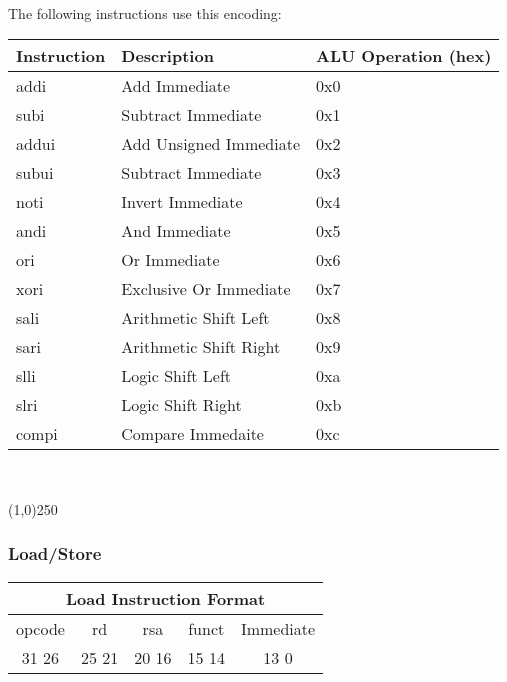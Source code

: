 \documentclass[letterpaper, 11pt]{article}
\begin{document}
\paragraph{}The following instructions use this encoding:
\begin{center}
	\begin{tabular}{|l|l|l|} \hline
			Instruction & Description 						& ALU Operation (hex) \\ \hline
			addi		& Add Immediate						& 0x0 \\ \hline
			subi 		& Subtract Immediate				& 0x1 \\ \hline
			addui 		& Add Unsigned Immediate			& 0x2 \\ \hline
			subui		& Subtract Immediate 				& 0x3 \\ \hline
			noti		& Invert Immediate					& 0x4 \\ \hline
			andi		& And Immediate						& 0x5 \\ \hline
			ori			& Or Immediate						& 0x6 \\ \hline
			xori		& Exclusive Or Immediate			& 0x7 \\ \hline
			sali		& Arithmetic Shift Left				& 0x8 \\ \hline
			sari		& Arithmetic Shift Right			& 0x9 \\ \hline
			slli		& Logic Shift Left 					& 0xa \\ \hline
			slri		& Logic Shift Right					& 0xb \\ \hline
			compi		& Compare Immedaite					& 0xc \\ \hline

	\end{tabular} \\
\end{center}
\begin{center}
	\line(1,0){250}
\end{center}

\newpage
\subsubsection{Load/Store}
\begin{center}
		\begin{tabular}{|c|c|c|c|c|}
			\multicolumn{5}{c}{Load Instruction Format}\\ \hline
				\hspace{2pt} opcode \hspace{2pt} & \hspace{5pt} rd \hspace{5pt} &  \hspace{4pt} rsa \hspace{4pt} & \hspace{3pt} funct \hspace{3pt} & \hspace{10pt} Immediate \hspace{10pt}   \\	\hline
				31 \hfill 26& 25 \hfill 21 &20 \hfill  16& 15 \hfill 14  & 13 \hfill 0\\ \hline
		
	\end{tabular}
\end{center}
\end{document}
